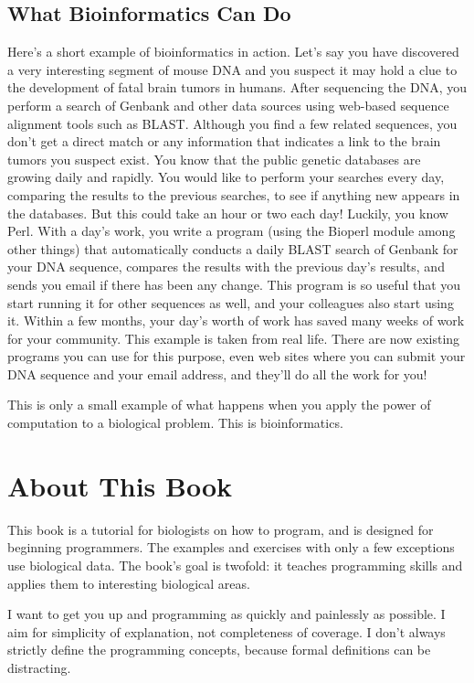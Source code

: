 \subsection*{What Bioinformatics Can Do}
Here's a short example of bioinformatics in action. Let's say you have discovered a very interesting segment of mouse DNA and you suspect it may hold a clue to the development of fatal brain tumors in humans.  After sequencing the DNA, you perform a search of Genbank and other data sources using web-based sequence alignment tools such as BLAST. Although you find a few related sequences, you don't get a direct match or any information that indicates a link to the brain tumors you suspect exist. You know that the public genetic databases are growing daily and rapidly. You would like to perform your searches every day, comparing the results to the previous searches, to see if anything new appears in the databases. But this could take an hour or two each day! Luckily, you know Perl. With a day's work, you write a program (using the Bioperl module among other things) that automatically conducts a daily BLAST search of Genbank for your DNA sequence, compares the results with the previous day's results, and sends you email if there has been any change. This program is so useful that you start running it for other sequences as well, and your colleagues also start using it. Within a few months, your day's worth of work has saved many weeks of work for your community. This example is taken from real life. There are now existing programs you can use for this purpose, even web sites where you can submit your DNA sequence and your email address, and they'll do all the work for you!

This is only a small example of what happens when you apply the power of computation to a biological problem. This is bioinformatics.

\section*{About This Book}
This book is a tutorial for biologists on how to program, and is designed for beginning programmers. The examples and exercises with only a few exceptions use biological data. The book's goal is twofold: it teaches programming skills and applies them to interesting biological areas.

I want to get you up and programming as quickly and painlessly as possible. I aim for simplicity of explanation, not completeness of coverage. I don't always strictly define the programming concepts, because formal definitions can be distracting.

